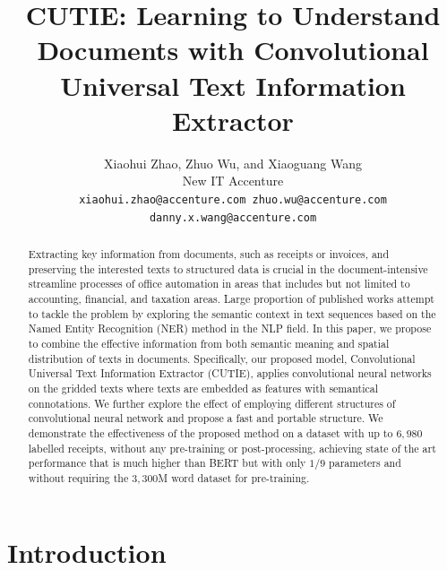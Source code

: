 \documentclass[10pt,twocolumn,letterpaper]{article}
\begin{document}
\title{CUTIE: Learning to Understand Documents with Convolutional Universal Text Information Extractor}

\author{
  Xiaohui Zhao, Zhuo Wu, and Xiaoguang Wang \\
  New IT Accenture \\
{\tt\small xiaohui.zhao@accenture.com zhuo.wu@accenture.com danny.x.wang@accenture.com}
}

\maketitle

\begin{abstract}
   Extracting key information from documents, such as receipts or invoices, and preserving the interested texts to structured data is crucial in the document-intensive streamline processes of office automation in areas that includes but not limited to accounting, financial, and taxation areas. Large proportion of published works attempt to tackle the problem by exploring the semantic context in text sequences based on the Named Entity Recognition (NER) method in the NLP field. In this paper, we propose to combine the effective information from both semantic meaning and spatial distribution of texts in documents. Specifically, our proposed model, Convolutional Universal Text Information Extractor (CUTIE), applies convolutional neural networks on the gridded texts where texts are embedded as features with semantical connotations. We further explore the effect of employing different structures of convolutional neural network and propose a fast and portable structure. We demonstrate the effectiveness of the proposed method on a dataset with up to $6,980$ labelled receipts, without any pre-training or post-processing, achieving state of the art performance that is much higher than BERT but with only $1/9$ parameters and without requiring the $3,300$M word dataset for pre-training.
\end{abstract}

\section{Introduction}
\end{document}
